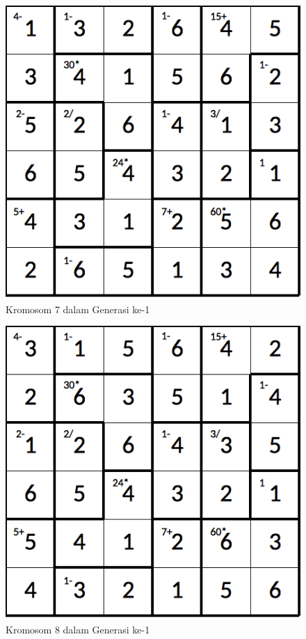 \begin{figure}
\centering
\captionsetup{justification=centering}
\includegraphics[scale=0.333]{Gambar/hybridgenetic/Generation1Chromosome7}
\caption[Kromosom 7 dalam Generasi ke-1]{Kromosom 7 dalam Generasi ke-1}
\label{fig:analisisg1k7}
\end{figure}

\begin{figure}
\centering
\captionsetup{justification=centering}
\includegraphics[scale=0.333]{Gambar/hybridgenetic/Generation1Chromosome8}
\caption[Kromosom 8 dalam Generasi ke-1]{Kromosom 8 dalam Generasi ke-1}
\label{fig:analisisg1k8}
\end{figure}


